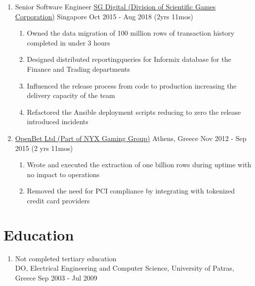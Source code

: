 \documentclass{CVSoftwareEngineer}
\begin{document}
\begin{enumerate}[labelwidth=!, labelindent=0pt, leftmargin=*, rightmargin=15pt]
		\item[] \cvExperience
			{Senior Software Engineer}
			{\href{https://www.sgdigital.com/}{SG Digital (Division of Scientific Games Corporation)}}
			{Singapore}
			{Oct 2015 - Aug 2018 (2yrs 11mos)}
			{
				\begin{enumerate}[labelwidth=!, labelindent=0pt, nosep, leftmargin=*]
					\item[\textasteriskcentered] Owned the data migration of 100 million rows of
						transaction history completed in under 3 hours
					\item[\textasteriskcentered] Designed distributed reportingqueries for Informix
						database for the Finance and Trading departments
					\item[\textasteriskcentered] Influenced the release process from code to
						production increasing the delivery capacity of the team
					\item[\textasteriskcentered] Refactored the Ansible deployment scripts
						reducing to zero the release introduced incidents
				\end{enumerate}
			}

		\item[]  
			{\href{http://www.openbet.com}{OpenBet Ltd (Part of NYX Gaming Group)}}
			{Athens, Greece}
			{Nov 2012 - Sep 2015 (2 yrs 11mos)}
			{
				\begin{enumerate}[labelwidth=!, labelindent=0pt, nosep, leftmargin=*]
					\item[\textasteriskcentered] Wrote and executed the extraction of
						one billion rows during uptime with no impact to operations
					\item[\textasteriskcentered] Removed the need for PCI compliance by
						integrating with tokenized credit card providers
				\end{enumerate}
			}
	\end{enumerate}

	\section{Education}
	\begin{enumerate}[labelwidth=!, labelindent=0pt, leftmargin=*, rightmargin=15pt]
		\item[] Not completed tertiary education \\
			DO, Electrical Engineering and Computer Science, University of Patras, Greece \hfill {\scriptsize Sep 2003 - Jul 2009}
	\end{enumerate}
\end{document}
